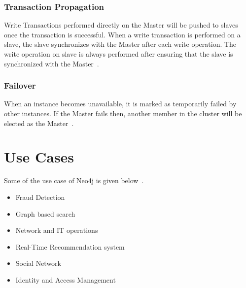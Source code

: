 \documentclass[9pt,twocolumn,twoside]{../../styles/osajnl}
\begin{document}
\subsubsection{Transaction Propagation}
Write Transactions performed directly on the Master will be pushed to slaves once the transaction is successful. When a write transaction is performed on a slave, the slave synchronizes with the Master after each write operation. The write operation on slave is always performed after ensuring that the slave is synchronized with the Master~\cite{www-neo4j-ha}. 

\subsubsection{Failover}
When an instance becomes unavailable, it is marked as temporarily failed by other instances. If the Master fails then, another member in the cluster will be elected as the Master~\cite{www-neo4j-ha}. 


\section{Use Cases}
Some of the use case of Neo4j is given below~\cite{www-neo4j-uc}.
\begin{itemize}
    \item Fraud Detection
    \item Graph based search
    \item Network and IT operations
    \item Real-Time Recommendation system
    \item Social Network
    \item Identity and Access Management
\end{itemize}

\end{document}
